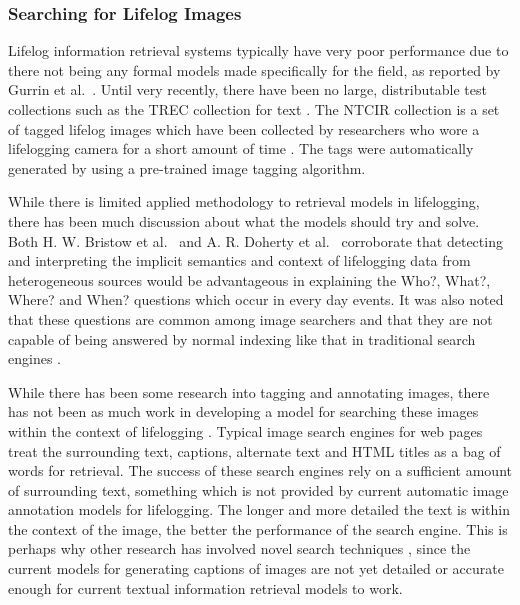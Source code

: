 \subsubsection{Searching for Lifelog Images}
Lifelog information retrieval systems typically have very poor performance due to there not being any formal models made specifically for the field, as reported by Gurrin et al.~\citep{gurrin2014lifelogging}. Until very recently, there have been no large, distributable test collections such as the TREC collection for text \citep{gurrin2014lifelogging}. The NTCIR collection is a set of tagged lifelog images which have been collected by researchers who wore a lifelogging camera for a short amount of time \citep{gurrin2016ntcir}. The tags were automatically generated by using a pre-trained image tagging algorithm.

While there is limited applied methodology to retrieval models in lifelogging, there has been much discussion about what the models should try and solve. Both H.  W.  Bristow et al.~\citep{bristow2004defining} and A. R. Doherty et al.~\cite{doherty2010automatically} corroborate that detecting and interpreting the implicit semantics and context of lifelogging data from heterogeneous sources would be advantageous in explaining the Who?, What?, Where? and When? questions which occur in every day events. It was also noted that these questions are common among image searchers and that they are not capable of being answered by normal indexing like that in traditional search engines \citep{ali2010semantically}.

While there has been some research into tagging and annotating images, there has not been as much work in developing a model for searching these images within the context of lifelogging \citep{gurrin2014lifelogging}. Typical image search engines for web pages treat the surrounding text, captions, alternate text and HTML titles \citep{frankel1996webseer} as a bag of words for retrieval. The success of these search engines rely on a sufficient amount of surrounding text, something which is not provided by current automatic image annotation models for lifelogging. The longer and more detailed the text is within the context of the image, the better the performance of the search engine. This is perhaps why other research has involved novel search techniques \citep{vuurpij2002vind}, since the current models for generating captions of images are not yet detailed or accurate enough for current textual information retrieval models to work.

